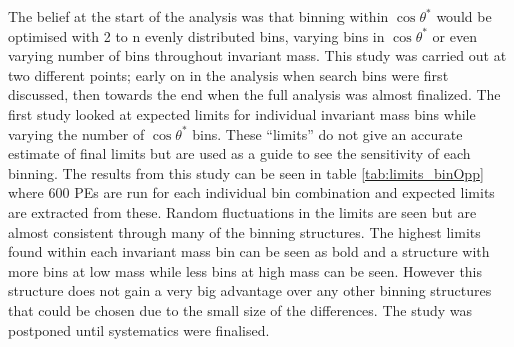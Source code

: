     The belief at the start of the analysis was that binning within $\cos{\theta^{*}}$ would be optimised with 2 to n evenly distributed bins, varying bins in $\cos{\theta^{*}}$ or even varying number of bins throughout invariant mass. 
    This study was carried out at two different points; early on in the analysis when search bins were first discussed, then towards the end when the full analysis was almost finalized. The first study looked at expected limits for individual invariant mass bins while varying the number of $\cos{\theta^{*}}$ bins. These ``limits'' do not give an accurate estimate of final limits but are used as a guide to see the sensitivity of each binning. The results from this study can be seen in table \ref{tab:limits_binOpp} where 600 PEs are run for each individual bin combination and expected limits are extracted from these. 
    Random fluctuations in the limits are seen but are almost consistent through many of the binning structures. The highest limits found within each invariant mass bin can be seen as bold and a structure with more bins at low mass while less bins at high mass can be seen. However this structure does not gain a very big advantage over any other binning structures that could be chosen due to the small size of the differences. The study was postponed until systematics were finalised. 

